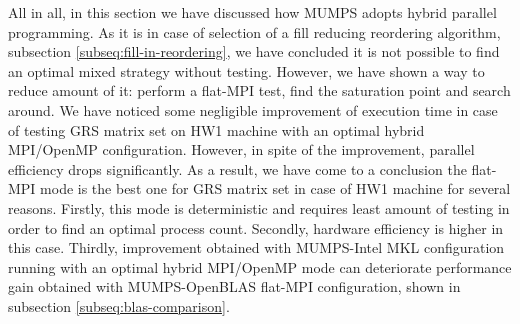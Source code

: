 All in all, in this section we have discussed how MUMPS adopts hybrid parallel programming. As it is in case of selection of a fill reducing reordering algorithm, subsection \ref{subseq:fill-in-reordering}, we have concluded it is not possible to find an optimal mixed strategy without testing. However, we have shown a way to reduce amount of it: perform a flat-MPI test, find the saturation point and search around. We have noticed some negligible improvement of execution time in case of testing GRS matrix set on HW1 machine with an optimal hybrid MPI/OpenMP configuration. However, in spite of the improvement, parallel efficiency drops significantly. As a result, we have come to a conclusion the flat-MPI mode is the best one for GRS matrix set in case of HW1 machine for several reasons. Firstly, this mode is deterministic and requires least amount of testing in order to find an optimal process count. Secondly, hardware efficiency is higher in this case. Thirdly, improvement obtained with MUMPS-Intel MKL configuration running with an optimal hybrid MPI/OpenMP mode can deteriorate performance gain obtained with MUMPS-OpenBLAS flat-MPI configuration, shown in subsection \ref{subseq:blas-comparison}.\\ 